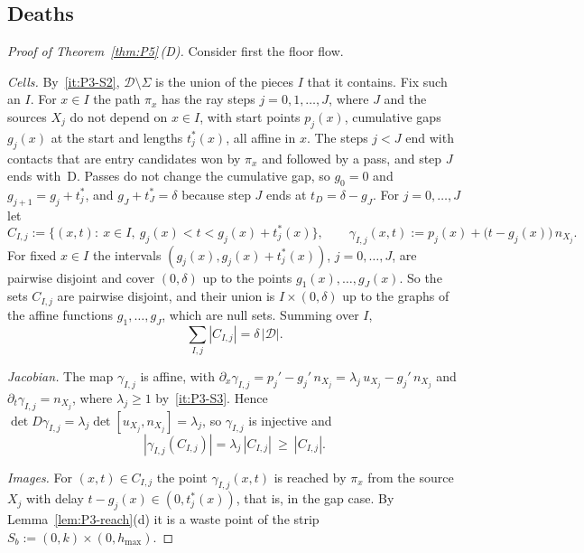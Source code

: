 \documentclass[11pt]{amsart}
\newcommand{\cD}{\mathcal D}
\newcommand{\hmax}{h_{\max}}
\theoremstyle{definition}
\theoremstyle{remark}
\numberwithin{equation}{section}
\begin{document}
\subsection{Deaths}\label{ssec:P5-D}

\begin{proof}[Proof of Theorem~\ref{thm:P5}\,\textup{(D)}]
Consider first the floor flow.

\emph{Cells.} By~\ref{it:P3-S2}, $\cD\setminus\Sigma$ is the union of the pieces $I$ that it contains. Fix such an $I$. For $x\in I$ the path $\pi_x$ has the ray steps $j=0,1,\dots,J$, where $J$ and the sources $X_j$ do not depend on $x\in I$, with start points $p_j(x)$, cumulative gaps $g_j(x)$ at the start and lengths $t^*_j(x)$, all affine in $x$. The steps $j<J$ end with contacts that are entry candidates won by $\pi_x$ and followed by a pass, and step $J$ ends with~D. Passes do not change the cumulative gap, so $g_0=0$ and $g_{j+1}=g_j+t^*_j$, and $g_J+t^*_J=\delta$ because step $J$ ends at $t_D=\delta-g_J$. For $j=0,\dots,J$ let
\[
C_{I,j}:=\{(x,t):\ x\in I,\ g_j(x)<t<g_j(x)+t^*_j(x)\},\qquad
\gamma_{I,j}(x,t):=p_j(x)+\big(t-g_j(x)\big)\,n_{X_j}.
\]
For fixed $x\in I$ the intervals $(g_j(x),g_j(x)+t^*_j(x))$, $j=0,\dots,J$, are pairwise disjoint and cover $(0,\delta)$ up to the points $g_1(x),\dots,g_J(x)$. So the sets $C_{I,j}$ are pairwise disjoint, and their union is $I\times(0,\delta)$ up to the graphs of the affine functions $g_1,\dots,g_J$, which are null sets. Summing over $I$,
\begin{equation}\label{eq:P5-cells}
\sum_{I,j}|C_{I,j}|=\delta\,|\cD| .
\end{equation}

\emph{Jacobian.} The map $\gamma_{I,j}$ is affine, with $\partial_x\gamma_{I,j}=p_j'-g_j'\,n_{X_j}=\lambda_j\,u_{X_j}-g_j'\,n_{X_j}$ and $\partial_t\gamma_{I,j}=n_{X_j}$, where $\lambda_j\ge1$ by~\ref{it:P3-S3}. Hence $\det D\gamma_{I,j}=\lambda_j\det[u_{X_j},n_{X_j}]=\lambda_j$, so $\gamma_{I,j}$ is injective and
\[
|\gamma_{I,j}(C_{I,j})|=\lambda_j\,|C_{I,j}|\ \ge\ |C_{I,j}| .
\]

\emph{Images.} For $(x,t)\in C_{I,j}$ the point $\gamma_{I,j}(x,t)$ is reached by $\pi_x$ from the source $X_j$ with delay $t-g_j(x)\in(0,t^*_j(x))$, that is, in the gap case. By Lemma~\ref{lem:P3-reach}(d) it is a waste point of the strip $S_b:=(0,k)\times(0,\hmax)$.


\end{proof}
\end{document}
